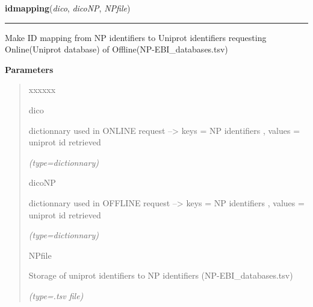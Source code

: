 \hspace{.8\funcindent}\begin{boxedminipage}{\funcwidth}

    \raggedright \textbf{idmapping}(\textit{dico}, \textit{dicoNP}, \textit{NPfile})

    \vspace{-1.5ex}

    \rule{\textwidth}{0.5\fboxrule}
\setlength{\parskip}{2ex}
    Make ID mapping from NP identifiers to Uniprot identifiers requesting 
    Online(Uniprot database) of Offline(NP-EBI\_databases.tsv)

\setlength{\parskip}{1ex}
      \textbf{Parameters}
      \vspace{-1ex}

      \begin{quote}
        \begin{Ventry}{xxxxxx}

          \item[dico]

          dictionnary used in ONLINE request --{\textgreater} keys = NP 
          identifiers , values = uniprot id retrieved

            {\it (type=dictionnary)}

          \item[dicoNP]

          dictionnary used in OFFLINE request --{\textgreater} keys = NP 
          identifiers , values = uniprot id retrieved

            {\it (type=dictionnary)}

          \item[NPfile]

          Storage of uniprot identifiers to NP identifiers 
          (NP-EBI\_databases.tsv)

            {\it (type=.tsv file)}

        \end{Ventry}

      \end{quote}

    \end{boxedminipage}

    \label{VCFtoGO:UNIPROTtoGO}

    \vspace{0.5ex}

